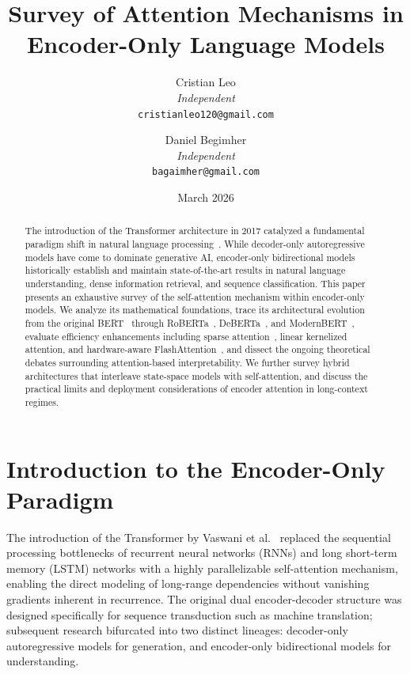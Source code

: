 \documentclass[11pt]{article}
\title{%
  \textbf{Survey of Attention Mechanisms in\\
  Encoder-Only Language Models}
}
\author{
  Cristian Leo \\
  \textit{Independent} \\
  \texttt{cristianleo120@gmail.com}
  \and
  Daniel Begimher \\
  \textit{Independent} \\
  \texttt{bagaimher@gmail.com}
}
\date{March 2026}
\begin{document}
\maketitle

\begin{abstract}
The introduction of the Transformer architecture in 2017 catalyzed a fundamental paradigm shift in natural language processing~\cite{vaswani2017attention}. While decoder-only autoregressive models have come to dominate generative AI, encoder-only bidirectional models historically establish and maintain state-of-the-art results in natural language understanding, dense information retrieval, and sequence classification. This paper presents an exhaustive survey of the self-attention mechanism within encoder-only models. We analyze its mathematical foundations, trace its architectural evolution from the original BERT~\cite{devlin2018bert} through RoBERTa~\cite{liu2019roberta}, DeBERTa~\cite{he2020deberta}, and ModernBERT~\cite{warner2024smarter}, evaluate efficiency enhancements including sparse attention~\cite{zaheer2020big}, linear kernelized attention, and hardware-aware FlashAttention~\cite{dao2022flashattention}, and dissect the ongoing theoretical debates surrounding attention-based interpretability. We further survey hybrid architectures that interleave state-space models with self-attention, and discuss the practical limits and deployment considerations of encoder attention in long-context regimes.
\end{abstract}

\tableofcontents
\newpage

\section{Introduction to the Encoder-Only Paradigm}

The introduction of the Transformer by Vaswani et al.~\cite{vaswani2017attention} replaced the sequential processing bottlenecks of recurrent neural networks (RNNs) and long short-term memory (LSTM) networks with a highly parallelizable self-attention mechanism, enabling the direct modeling of long-range dependencies without vanishing gradients inherent in recurrence. The original dual encoder-decoder structure was designed specifically for sequence transduction such as machine translation; subsequent research bifurcated into two distinct lineages: decoder-only autoregressive models for generation, and encoder-only bidirectional models for understanding.
\end{document}
